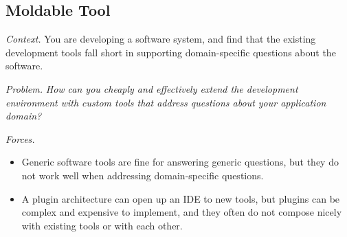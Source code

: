 \documentclass[acmsmall,screen,authorversion,nonacm]{acmart} %
\newcommand\tk[1]{\nbc{Timo}{#1}{cyan}}
\newcommand\kh[1]{\nbc{Konrad}{#1}{violet}}
\newcommand\cp[1]{\nbe{Cesare}{#1}{olive}} %
\newcommand\dd[1]{\nbe{Daniel}{#1}{magenta}} %
\newcommand{\pattern}[2]{\needlines{10}
\subsection*{#1}\label{pat:#2}}
\newcommand{\patsec}[1]{\noindent\textit{#1.}\xspace}
\begin{document}
\pattern{Moldable Tool}{MoldableTool}


\patsec{Context}
You are developing a software system, and find that the existing development tools fall short in supporting
domain-specific questions about the software.

\patsec{Problem}
\emph{How can you cheaply and effectively extend the development environment with custom tools that address questions about your application domain?}

\patsec{Forces}
\begin{itemize}[---]
\item Generic software tools are fine for answering generic questions, but they do not work well when addressing domain-specific questions.
\item A plugin architecture can open up an IDE to new tools, but plugins can be complex and expensive to implement, 
and they often do not compose nicely with existing tools or with each other.
\end{itemize}

\end{document}

